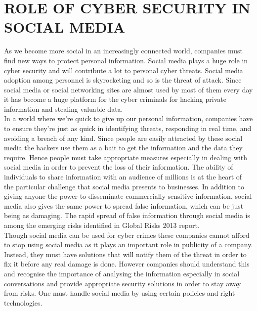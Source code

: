 \chapter{ ROLE OF CYBER SECURITY IN SOCIAL MEDIA  
}
\hspace*{0.3in}As we become more social in an increasingly 
connected world, companies must find new 
ways to protect personal information. Social 
media plays a huge role in cyber security and 
will contribute a lot to personal cyber threats. 
Social media adoption among personnel is 
skyrocketing and so is the threat of attack. Since 
social media or social networking sites are 
almost used by most of them every day it has 
become a huge platform for the cyber criminals 
for hacking private information and stealing 
valuable data. 
\\
\hspace*{0.3in}In a world where we’re quick to give up our 
personal information, companies have to ensure 
they’re just as quick in identifying threats, 
responding in real time, and avoiding a breach 
of any kind. Since people are easily attracted by 
these social media the hackers use them as a bait 
to get the information and the data they require. 
Hence people must take appropriate measures 
especially in dealing with social media in order 
to prevent the loss of their information.
The ability of individuals to share information 
with an audience of millions is at the heart of the 
particular challenge that social media presents to 
businesses. In addition to giving anyone the 
power to disseminate commercially sensitive 
information, social media also gives the same 
power to spread false information, which can be 
just being as damaging. The rapid spread of 
false information through social media is among 
the emerging risks identified in Global Risks 
2013 report.\\

\hspace*{0.3in}Though social media can be used for cyber 
crimes these companies cannot afford to stop 
using social media as it plays an important role 
in publicity of a company. Instead, they must 
have solutions that will notify them of the threat 
in order to fix it before any real damage is done.
However companies should understand this and 
recognise the importance of analysing the 
information especially in social conversations 
and provide appropriate security solutions in 
order to stay away from risks. One must handle 
social media by using certain policies and right 
technologies.\\
